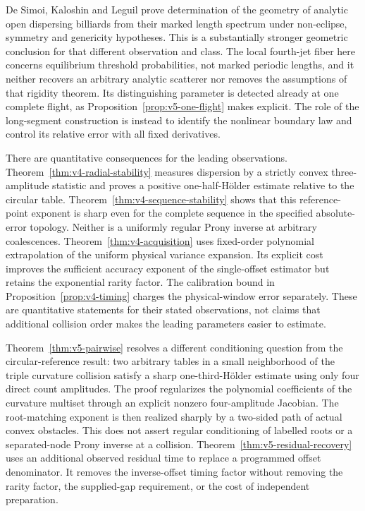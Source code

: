 De Simoi, Kaloshin and Leguil \cite{DKLAnalytic} prove determination
of the geometry of analytic open dispersing billiards from their marked
length spectrum under non-eclipse, symmetry and genericity hypotheses.
This is a substantially stronger geometric conclusion for that
different observation and class. The local fourth-jet fiber here
concerns equilibrium threshold probabilities, not marked periodic
lengths, and it neither recovers an arbitrary analytic scatterer nor
removes the assumptions of that rigidity theorem. Its distinguishing
parameter is detected already at one complete flight, as
Proposition~\ref{prop:v5-one-flight} makes explicit. The role of the
long-segment construction is instead to identify the nonlinear boundary
law and control its relative error with all fixed derivatives.

There are quantitative consequences for the leading observations.
Theorem~\ref{thm:v4-radial-stability} measures dispersion by a strictly
convex three-amplitude statistic and proves a positive one-half-H\"older
estimate relative to the circular table. Theorem~\ref{thm:v4-sequence-stability}
shows that this reference-point exponent is sharp even for the complete
sequence in the specified absolute-error topology. Neither is a
uniformly regular Prony inverse at arbitrary coalescences.
Theorem~\ref{thm:v4-acquisition} uses fixed-order polynomial
extrapolation of the uniform physical variance expansion. Its explicit
cost improves the sufficient accuracy exponent of the single-offset
estimator but retains the exponential rarity factor. The calibration
bound in Proposition~\ref{prop:v4-timing} charges the physical-window
error separately. These are quantitative statements for their stated
observations, not claims that additional collision order makes the
leading parameters easier to estimate.

Theorem~\ref{thm:v5-pairwise} resolves a different conditioning
question from the circular-reference result: two arbitrary tables in
a small neighborhood of the triple curvature collision satisfy a sharp
one-third-H\"older estimate using only four direct count amplitudes.
The proof regularizes the polynomial coefficients of the curvature
multiset through an explicit nonzero four-amplitude Jacobian. The
root-matching exponent is then realized sharply by a two-sided path
of actual convex obstacles. This does not assert regular conditioning
of labelled roots or a separated-node Prony inverse at a collision.
Theorem~\ref{thm:v5-residual-recovery} uses an additional observed
residual time to replace a programmed offset denominator. It removes
the inverse-offset timing factor without removing the rarity factor,
the supplied-gap requirement, or the cost of independent preparation.

